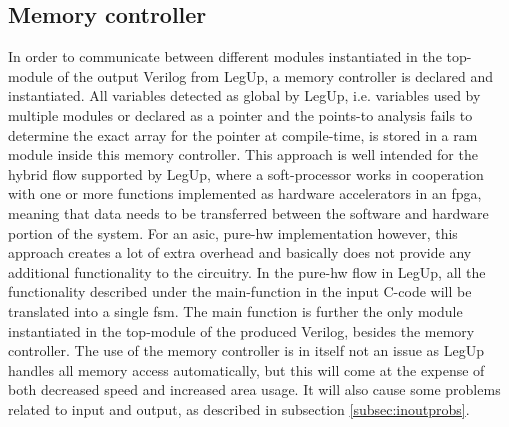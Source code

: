 \subsection{\label{subsec:memctrl}Memory controller}
In order to communicate between different modules instantiated in the top-module of the output Verilog from LegUp, a memory controller is declared and instantiated. All variables detected as global by LegUp, i.e. variables used by multiple modules or declared as a pointer and the points-to analysis fails to determine the exact array for the pointer at compile-time, is stored in a \gls{ram} module inside this memory controller. This approach is well intended for the hybrid flow supported by LegUp, where a soft-processor works in cooperation with one or more functions implemented as hardware accelerators in an \gls{fpga}, meaning that data needs to be transferred between the software and hardware portion of the system. For an \gls{asic}, pure-\gls{hw} implementation however, this approach creates a lot of extra overhead and basically does not provide any additional functionality to the circuitry. In the pure-\gls{hw} flow in LegUp, all the functionality described under the main-function in the input C-code will be translated into a single \gls{fsm}. The main function is further the only module instantiated in the top-module of the produced Verilog, besides the memory controller. The use of the memory controller is in itself not an issue as LegUp handles all memory access automatically, but this will come at the expense of both decreased speed and increased area usage. It will also cause some problems related to input and output, as described in subsection \ref{subsec:inoutprobs}.
